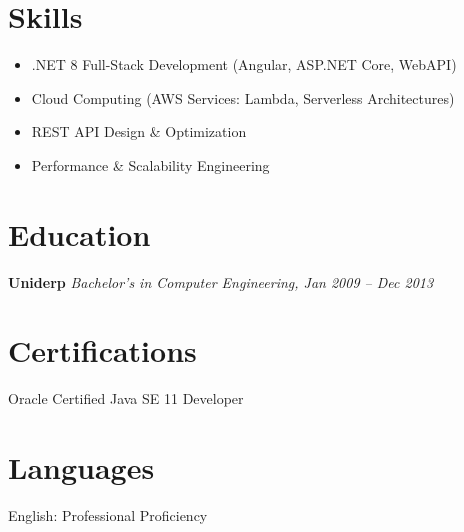 \documentclass[a4paper,10pt]{article}
\begin{document}
\hfill
\begin{minipage}[t]{0.32\textwidth}
\raggedright
    \section*{Skills}
    \begin{itemize}
        \item .NET 8 Full-Stack Development (Angular, ASP.NET Core, WebAPI)
        \item Cloud Computing (AWS Services: Lambda, Serverless Architectures)
        \item REST API Design \& Optimization
        \item Performance \& Scalability Engineering
    \end{itemize}
    
    \vspace{4mm}
    \section*{Education}
    \textbf{Uniderp} \hfill \textit{Bachelor’s in Computer Engineering, Jan 2009 – Dec 2013}
    
    \vspace{4mm}
    \section*{Certifications}
    Oracle Certified Java SE 11 Developer
    
    \vspace{4mm}
    \section*{Languages}
    English: Professional Proficiency
\end{minipage}
\end{document}
